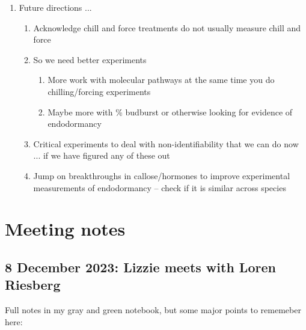 \documentclass[11pt,letter]{article}
\begin{document}
\begin{enumerate}
\begin{enumerate}
\begin{enumerate}
\end{enumerate}
\end{enumerate}
\item Future directions ... 
\begin{enumerate}
\item Acknowledge chill and force treatments do not usually measure chill and force
\item So we need better experiments
\begin{enumerate}
\item More work with molecular pathways at the same time you do chilling/forcing experiments
\item Maybe more with \% budburst or otherwise looking for evidence of endodormancy
\end{enumerate}
\item Critical experiments to deal with non-identifiability that we can do now ... if we have figured any of these out
\item Jump on breakthroughs in callose/hormones to improve experimental measurements of endodormancy -- check if it is similar across species
\end{enumerate}
\end{enumerate}


\clearpage

\section{Meeting notes}
\subsection{8 December 2023: Lizzie meets with Loren Riesberg}

Full notes in my gray and green notebook, but some major points to rememeber here:
\end{document}
